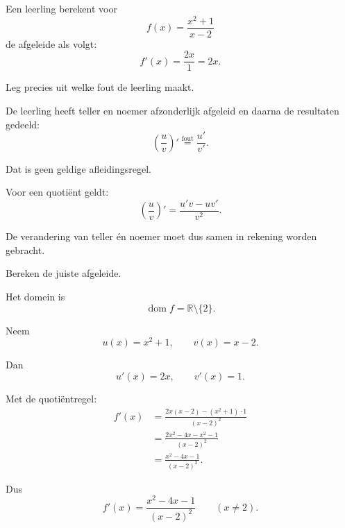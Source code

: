 \documentclass{ximera}
\begin{document}
  \begin{oefening}{\oefU\ESS}
  
  Een leerling berekent voor
  \[
  f(x)=\frac{x^2+1}{x-2}
  \]
  de afgeleide als volgt:
  \[
  f'(x)=\frac{2x}{1}=2x.
  \]
  
  \begin{question}
  
  Leg precies uit welke fout de leerling maakt.
  
  \begin{oplossing}
  De leerling heeft teller en noemer afzonderlijk afgeleid en daarna
  de resultaten gedeeld:
  \[
  \left(\frac{u}{v}\right)'
  \stackrel{\text{fout}}{=}
  \frac{u'}{v'}.
  \]
  
  Dat is geen geldige afleidingsregel.
  
  Voor een quotiënt geldt:
  \[
  \boxed{
  \left(\frac{u}{v}\right)'
  =
  \frac{u'v-uv'}{v^2}
  }.
  \]
  
  De verandering van teller én noemer moet dus samen in rekening
  worden gebracht.
  \end{oplossing}
  
  \end{question}
  
  
  \begin{question}
  
  Bereken de juiste afgeleide.
  
  \begin{oplossing}
  Het domein is
  \[
  \operatorname{dom}f=\mathbb{R}\setminus\{2\}.
  \]
  
  Neem
  \[
  u(x)=x^2+1,
  \qquad
  v(x)=x-2.
  \]
  
  Dan
  \[
  u'(x)=2x,
  \qquad
  v'(x)=1.
  \]
  
  Met de quotiëntregel:
  \[
  \begin{aligned}
  f'(x)
  &=
  \frac{
  2x(x-2)-(x^2+1)\cdot1
  }{
  (x-2)^2
  }\\
  &=
  \frac{
  2x^2-4x-x^2-1
  }{
  (x-2)^2
  }\\
  &=
  \frac{x^2-4x-1}{(x-2)^2}.
  \end{aligned}
  \]
  
  Dus
  \[
  \boxed{
  f'(x)=\frac{x^2-4x-1}{(x-2)^2}
  }
  \qquad (x\neq2).
  \]
  \end{oplossing}
  
  \end{question}
  
  
  \begin{question}
  

\end{question}
\end{oefening}
\end{document}
